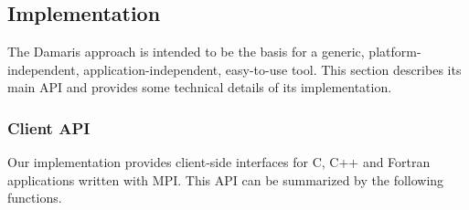 \subsection{Implementation}

The Damaris approach is intended to be the basis for a generic, platform-independent,
application-independent, easy-to-use tool. This section describes its main API and
provides some technical details of its implementation.

\subsubsection{Client API}

Our implementation provides client-side interfaces for C, C++ and Fortran applications written with MPI.
This API can be summarized by the following functions.
%
